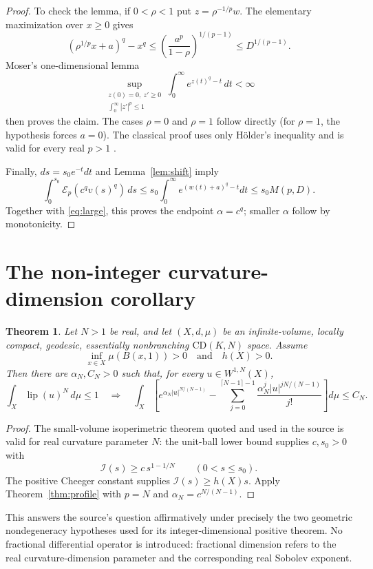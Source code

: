 \documentclass[11pt]{article}
\newtheorem{theorem}{Theorem}
\newcommand{\lip}{\operatorname{lip}}
\newcommand{\I}{\mathcal I}
\begin{document}
\begin{proof}
To check the lemma, if $0<\rho<1$ put $z=\rho^{-1/p}w$.  The elementary maximization over $x\geq0$ gives
\begin{equation}\label{eq:algebra}
 (\rho^{1/p}x+a)^q-x^q
 \leq\left(\frac{a^p}{1-\rho}\right)^{1/(p-1)}
 \leq D^{1/(p-1)}.
\end{equation}
Moser's one-dimensional lemma
\[
 \sup_{\substack{z(0)=0,\ z'\geq0\\\int_0^\infty|z'|^p\leq1}}
 \int_0^\infty e^{z(t)^q-t}\,dt<\infty
\]
then proves the claim.  The cases $\rho=0$ and $\rho=1$ follow directly (for $\rho=1$, the hypothesis forces $a=0$).  The classical proof uses only H\"older's inequality and is valid for every real $p>1$ \cite{Moser}.

Finally, $ds=s_0e^{-t}dt$ and Lemma~\ref{lem:shift} imply
\[
 \int_0^{s_0}\mathcal E_p(c^qv(s)^q)\,ds
 \leq s_0\int_0^\infty e^{(w(t)+a)^q-t}dt
 \leq s_0M(p,D).
\]
Together with \eqref{eq:large}, this proves the endpoint $\alpha=c^q$; smaller $\alpha$ follow by monotonicity.
\end{proof}

\section*{The non-integer curvature-dimension corollary}
\begin{theorem}\label{thm:cd}
Let $N>1$ be real, and let $(X,d,\mu)$ be an infinite-volume, locally compact, geodesic, essentially nonbranching $\mathrm{CD}(K,N)$ space.  Assume
\[
 \inf_{x\in X}\mu(B(x,1))>0
 \quad\text{and}\quad
 h(X)>0.
\]
Then there are $\alpha_N,C_N>0$ such that, for every $u\in W^{1,N}(X)$,
\[
 \int_X\lip(u)^N\,d\mu\leq1
 \quad\Longrightarrow\quad
 \int_X\left[
 e^{\alpha_N|u|^{N/(N-1)}}-
 \sum_{j=0}^{\lceil N-1\rceil-1}
 \frac{\alpha_N^j|u|^{jN/(N-1)}}{j!}
 \right]d\mu\leq C_N.
\]
\end{theorem}

\begin{proof}
The small-volume isoperimetric theorem quoted and used in the source is valid for real curvature parameter $N$: the unit-ball lower bound supplies $c,s_0>0$ with
\[
 \I(s)\geq c\,s^{1-1/N}\qquad(0<s\leq s_0).
\]
The positive Cheeger constant supplies $\I(s)\geq h(X)s$.  Apply Theorem~\ref{thm:profile} with $p=N$ and $\alpha_N=c^{N/(N-1)}$.
\end{proof}

This answers the source's question affirmatively under precisely the two geometric nondegeneracy hypotheses used for its integer-dimensional positive theorem.  No fractional differential operator is introduced: fractional dimension refers to the real curvature-dimension parameter and the corresponding real Sobolev exponent.
\end{document}
